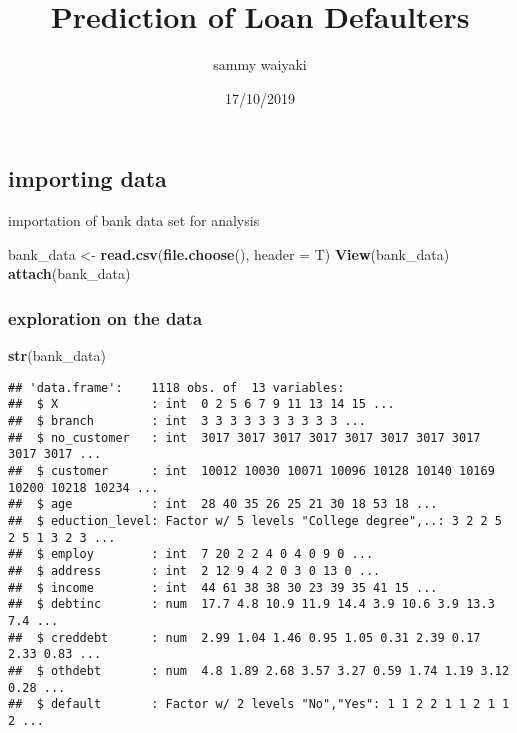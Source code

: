 \documentclass[]{article}
\title{Prediction of Loan Defaulters}
\author{sammy waiyaki}
\date{17/10/2019}
\newenvironment{Shaded}{\begin{snugshade}}{\end{snugshade}}
\newcommand{\DataTypeTok}[1]{\textcolor[rgb]{0.13,0.29,0.53}{#1}}
\newcommand{\KeywordTok}[1]{\textcolor[rgb]{0.13,0.29,0.53}{\textbf{#1}}}
\newcommand{\NormalTok}[1]{#1}
\newcommand{\StringTok}[1]{\textcolor[rgb]{0.31,0.60,0.02}{#1}}
\begin{document}
\maketitle

\hypertarget{importing-data}{%
\subsection{importing data}\label{importing-data}}

importation of bank data set for analysis

\begin{Shaded}
\begin{Highlighting}[]
\NormalTok{bank_data <-}\StringTok{ }\KeywordTok{read.csv}\NormalTok{(}\KeywordTok{file.choose}\NormalTok{(), }\DataTypeTok{header =}\NormalTok{ T)}
\KeywordTok{View}\NormalTok{(bank_data)}
\KeywordTok{attach}\NormalTok{(bank_data)}
\end{Highlighting}
\end{Shaded}

\hypertarget{exploration-on-the-data}{%
\subsubsection{exploration on the data}\label{exploration-on-the-data}}

\begin{Shaded}
\begin{Highlighting}[]
\KeywordTok{str}\NormalTok{(bank_data)}
\end{Highlighting}
\end{Shaded}

\begin{verbatim}
## 'data.frame':    1118 obs. of  13 variables:
##  $ X             : int  0 2 5 6 7 9 11 13 14 15 ...
##  $ branch        : int  3 3 3 3 3 3 3 3 3 3 ...
##  $ no_customer   : int  3017 3017 3017 3017 3017 3017 3017 3017 3017 3017 ...
##  $ customer      : int  10012 10030 10071 10096 10128 10140 10169 10200 10218 10234 ...
##  $ age           : int  28 40 35 26 25 21 30 18 53 18 ...
##  $ eduction_level: Factor w/ 5 levels "College degree",..: 3 2 2 5 2 5 1 3 2 3 ...
##  $ employ        : int  7 20 2 2 4 0 4 0 9 0 ...
##  $ address       : int  2 12 9 4 2 0 3 0 13 0 ...
##  $ income        : int  44 61 38 38 30 23 39 35 41 15 ...
##  $ debtinc       : num  17.7 4.8 10.9 11.9 14.4 3.9 10.6 3.9 13.3 7.4 ...
##  $ creddebt      : num  2.99 1.04 1.46 0.95 1.05 0.31 2.39 0.17 2.33 0.83 ...
##  $ othdebt       : num  4.8 1.89 2.68 3.57 3.27 0.59 1.74 1.19 3.12 0.28 ...
##  $ default       : Factor w/ 2 levels "No","Yes": 1 1 2 2 1 1 2 1 1 2 ...
\end{verbatim}
\end{document}
